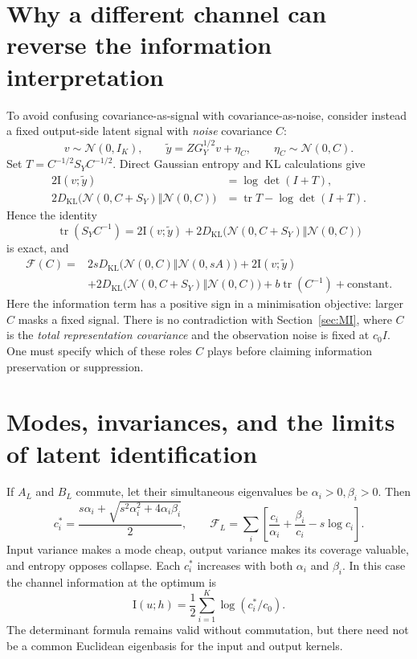 \documentclass[11pt,a4paper]{article}
\newcommand{\tr}{\operatorname{tr}}
\newcommand{\KL}{D_{\mathrm{KL}}}
\newcommand{\Id}{\mathrm I}
\newcommand{\N}{\mathcal N}
\newcommand{\F}{\mathcal F}
\begin{document}
\section{Why a different channel can reverse the information interpretation}
To avoid confusing covariance-as-signal with covariance-as-noise, consider
instead a fixed output-side latent signal with \emph{noise} covariance $C$:
\begin{equation}
 v\sim\N(0,I_K),\qquad
 \widetilde y=ZG_Y^{1/2}v+\eta_C,\qquad \eta_C\sim\N(0,C).
\end{equation}
Set $T=C^{-1/2}S_YC^{-1/2}$. Direct Gaussian entropy and KL calculations give
\begin{align}
 2\Id(v;\widetilde y)&=\log\det(I+T),\\
 2\KL\bigl(\N(0,C+S_Y)\Vert\N(0,C)\bigr)
 &=\tr T-\log\det(I+T).
\end{align}
Hence the identity
\begin{equation}
 \tr(S_YC^{-1})=2\Id(v;\widetilde y)
 +2\KL\bigl(\N(0,C+S_Y)\Vert\N(0,C)\bigr)
\end{equation}
is exact, and
\begin{align}
 \F(C)={}&2s\KL\bigl(\N(0,C)\Vert\N(0,sA)\bigr)
 +2\Id(v;\widetilde y)\nonumber\\
 &+2\KL\bigl(\N(0,C+S_Y)\Vert\N(0,C)\bigr)
 +b\tr(C^{-1})+\text{constant}.
\end{align}
Here the information term has a positive sign in a minimisation objective:
larger $C$ masks a fixed signal. There is no contradiction with
Section~\ref{sec:MI}, where $C$ is the \emph{total representation covariance}
and the observation noise is fixed at $c_0I$. One must specify which of
these roles $C$ plays before claiming information preservation or suppression.

\section{Modes, invariances, and the limits of latent identification}
If $A_L$ and $B_L$ commute, let their simultaneous eigenvalues be
$\alpha_i>0,\beta_i>0$. Then
\begin{equation}
 c_i^*=\frac{s\alpha_i+
 \sqrt{s^2\alpha_i^2+4\alpha_i\beta_i}}2,
 \qquad
 \F_L=\sum_i\left[\frac{c_i}{\alpha_i}+\frac{\beta_i}{c_i}-s\log c_i\right].
\end{equation}
Input variance makes a mode cheap, output variance makes its coverage
valuable, and entropy opposes collapse. Each $c_i^*$ increases with both
$\alpha_i$ and $\beta_i$. In this case the channel information at the optimum is
\begin{equation}
 \Id(u;h)=\frac12\sum_{i=1}^K\log(c_i^*/c_0).
\end{equation}
The determinant formula remains valid without commutation, but there need
not be a common Euclidean eigenbasis for the input and output kernels.
\end{document}
